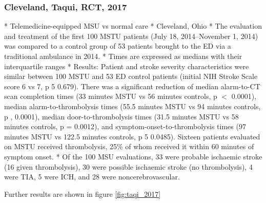 \subsubsection{Cleveland, Taqui, RCT, 2017 \cite{taqui_reduction_2017}}

\begin{markdown}
* Telemedicine-equipped MSU vs normal care
* Cleveland, Ohio
* The evaluation and treatment of the first 100 MSTU patients (July 18, 2014–November 1, 2014) was compared to a control group of 53 patients brought to the ED via a traditional ambulance in 2014. 
* Times are expressed as medians with their interquartile ranges
* Results: Patient and stroke severity characteristics were similar between 100 MSTU and 53 ED control patients (initial NIH Stroke Scale score 6 vs 7, p 5 0.679). There was a significant reduction of median alarm-to-CT scan completion times (33 minutes MSTU vs 56 minutes controls, p $<$ 0.0001), median alarm-to-thrombolysis times (55.5 minutes MSTU vs 94 minutes controls, p , 0.0001), median door-to-thrombolysis times (31.5 minutes MSTU vs 58 minutes controls, p = 0.0012), and symptom-onset-to-thrombolysis times (97 minutes MSTU vs 122.5 minutes controls, p 5 0.0485). Sixteen patients evaluated on MSTU received thrombolysis, 25\% of whom received it within 60 minutes of symptom onset.
* Of the 100 MSU evaluations, 33 were probable ischaemic stroke (16 given thrombolysis), 30 were possible ischaemic stroke (no thrombolysis), 4 were TIA, 5 were ICH, and 28 were noncerebrovascular.
   
\end{markdown}

Further results are shown in figure \ref{fig:taqi_2017}

